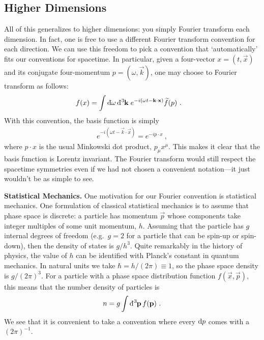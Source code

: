 \documentclass[12pt, oneside]{report}    %
\let\oldsection\section
\def\section{%
  \setcounter{sidenote}{1}%
  \oldsection
}
\begin{document}
\begin{subappendices}
\section{Higher Dimensions}

All of this generalizes to higher dimensions: you simply Fourier transform each dimension. In fact, one is free to use a different Fourier transform convention for each direction. We can use this freedom to pick a convention that `automatically' fits our conventions for spacetime. In particular, given a four-vector $x=(t,\vec{x})$ and its conjugate four-momentum $p=(\omega, \vec{k})$, one may choose to Fourier transform as follows: 
\begin{align}
  f(x) &= \int \Dbar\omega \DDbar{3}{\vec{k}}\; 
  e^{-i(\omega t-\vec{k}\cdot\vec{x})} \tilde f(p)
  \ .
\end{align}
With this convention, the basis function is simply
\begin{align}
  e^{-i(\omega t-\vec{k}\cdot\vec{x})} 
  = e^{-ip\cdot x} \ , 
\end{align}
where $p\cdot x$ is the usual Minkowski dot product, $p_\mu x^\mu$. This makes it clear that the basis function is Lorentz invariant. The Fourier transform would still respect the spacetime symmetries even if we had not chosen a convenient notation---it just wouldn't be as simple to see.



\begin{example}
\textbf{Statistical Mechanics.} One motivation for our Fourier convention is statistical mechanics. One formulation of classical statistical mechanics is to assume that phase space is discrete: a particle has momentum $\vec{p}$ whose components take integer multiples of some unit momentum, $h$. Assuming that the particle has $g$ internal degrees of freedom (e.g.~$g=2$ for a particle that can be spin-up or spin-down), then the density of states is $g/h^{3}$. Quite remarkably in the history of physics, the value of $h$ can be identified with Planck's constant in quantum mechanics. In natural units we take $\hbar = h/(2\pi)\equiv 1$, so the phase space density is $g/(2\pi)^3$. For a particle with a phase space distribution function $f(\vec{x},\vec{p})$, this means that the number density of particles is
\begin{align}
  n = g\int \DDbar{3}{\vec{p}} \, f(\vec{p}) \ .
\end{align}
We see that it is convenient to take a convention where every $\operatorname{d}\!{p}$ comes with a $(2\pi)^{-1}$.
\end{example}


\end{subappendices}
\end{document}

